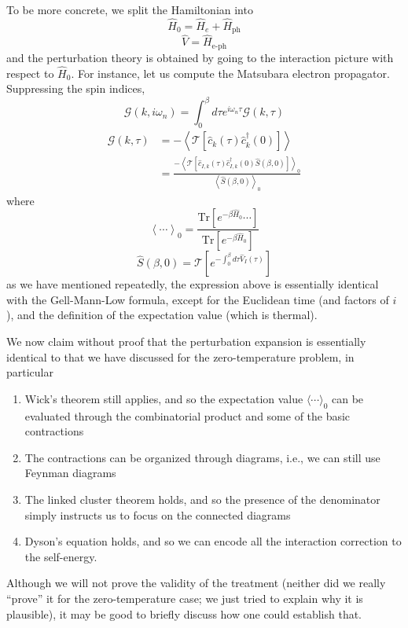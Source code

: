 To be more concrete, we split the Hamiltonian into
\[ \hat{H}_0=\hat{H}_e+\hat{H}_{\mathrm{ph}}\]
\[\hat{V}=\hat{H}_{\text{e-ph}}\]
and the perturbation theory is obtained by going to the interaction picture with respect to $\hat{H}_0$. For instance, let us compute the Matsubara electron propagator. Suppressing the spin indices,
\[ \mathcal{G} \left( k,i\omega _n \right) =\int_0^{\beta}{d\tau e^{i\omega _n\tau}\mathcal{G} \left( k,\tau \right)}\]
\begin{align*}
    \mathcal{G} \left( k,\tau \right) &=-\left< \mathcal{T} \left[ \hat{c}_k\left( \tau \right) \hat{c}_{k}^{\dagger}\left( 0 \right) \right] \right> \\
    &=\frac{-\left< \mathcal{T} \left[ \hat{c}_{I,k}\left( \tau \right) \hat{c}_{I,k}^{\dagger}\left( 0 \right) \hat{S}\left( \beta ,0 \right) \right] \right> _0}{\left< \hat{S}\left( \beta ,0 \right) \right> _0}
\end{align*}
where
\[ \left< \cdots \right> _0=\frac{\mathrm{Tr}\left[ e^{-\beta \hat{H}_0}\cdots \right]}{\mathrm{Tr}\left[ e^{-\beta \hat{H}_0} \right]}\]
\[ \hat{S}\left( \beta ,0 \right) =\mathcal{T} \left[ e^{-\int_0^{\beta}{d\tau \hat{V}_I\left( \tau \right)}} \right] \]
as we have mentioned repeatedly, the expression above is essentially identical with the Gell-Mann-Low formula, except for the Euclidean time (and factors of $i$), and the definition of the expectation value (which is thermal).

We now claim without proof that the perturbation expansion is essentially identical to that we have discussed for the zero-temperature problem, in particular
\begin{enumerate}
    \item Wick's theorem still applies, and so the expectation value $\langle\cdots\rangle_0$ can be evaluated through the combinatorial product and some of the basic contractions
    \item The contractions can be organized through diagrams, i.e., we can still use Feynman diagrams
    \item The linked cluster theorem holds, and so the presence of the denominator simply instructs us to focus on the connected diagrams
    \item Dyson's equation holds, and so we can encode all the interaction correction to the self-energy.
\end{enumerate}
Although we will not prove the validity of the treatment (neither did we really ``prove'' it for the zero-temperature case; we just tried to explain why it is plausible), it may be good to briefly discuss how one could establish that.

